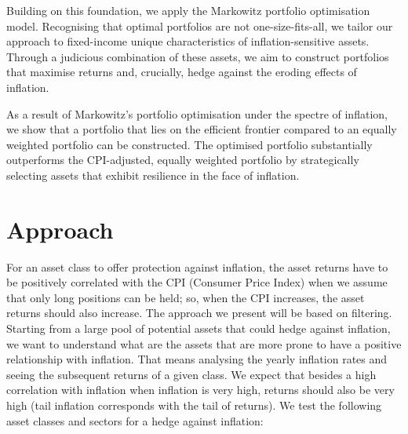 \documentclass{article}
\begin{document}
Building on this foundation, we apply the Markowitz portfolio optimisation model. Recognising that optimal portfolios are not one-size-fits-all, we tailor our approach to fixed-income unique characteristics of inflation-sensitive assets. Through a judicious combination of these assets, we aim to construct portfolios that maximise returns and, crucially, hedge against the eroding effects of inflation.

As a result of Markowitz's portfolio optimisation under the spectre of inflation, we show that a portfolio that lies on the efficient frontier compared to an equally weighted portfolio can be constructed. The optimised portfolio substantially outperforms the CPI-adjusted, equally weighted portfolio by strategically selecting assets that exhibit resilience in the face of inflation.

\newpage


\section{Approach}

For an asset class to offer protection against inflation, the asset returns have to be positively correlated with the CPI (Consumer Price Index) when we assume that only long positions can be held; so, when the CPI increases, the asset returns should also increase. The approach we present will be based on filtering. Starting from a large pool of potential assets that could hedge against inflation, we want to understand what are the assets that are more prone to have a positive relationship with inflation. That means analysing the yearly inflation rates and seeing the subsequent returns of a given class. We expect that besides a high correlation with inflation when inflation is very high, returns should also be very high (tail inflation corresponds with the tail of returns). We test the following asset classes and sectors for a hedge against inflation:
\end{document}
